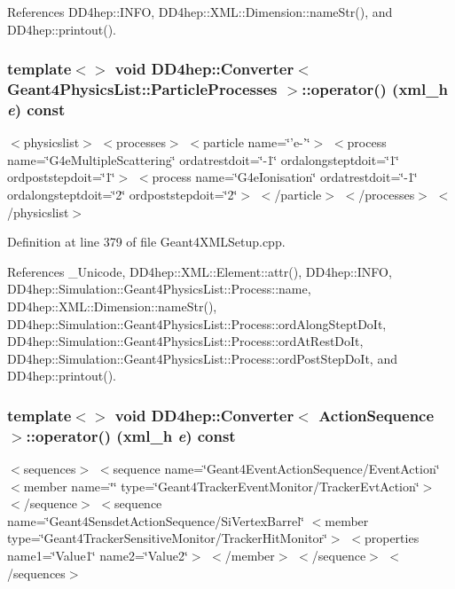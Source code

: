 References DD4hep::INFO, DD4hep::XML::Dimension::nameStr(), and DD4hep::printout().\hypertarget{struct_d_d4hep_1_1_converter_a981c80325c3558372d758b0661eb1582}{
\subsubsection[{operator()}]{\setlength{\rightskip}{0pt plus 5cm}template$<$$>$ void {\bf DD4hep::Converter}$<$ {\bf Geant4PhysicsList::ParticleProcesses} $>$::operator() ({\bf xml\_\-h} {\em e}) const}}
\label{struct_d_d4hep_1_1_converter_a981c80325c3558372d758b0661eb1582}
$<$physicslist$>$ $<$processes$>$ $<$particle name=\char`\"{}'e-\/'\char`\"{}$>$ $<$process name=\char`\"{}G4eMultipleScattering\char`\"{} ordatrestdoit=\char`\"{}-\/1\char`\"{} ordalongsteptdoit=\char`\"{}1\char`\"{} ordpoststepdoit=\char`\"{}1\char`\"{}$>$ $<$process name=\char`\"{}G4eIonisation\char`\"{} ordatrestdoit=\char`\"{}-\/1\char`\"{} ordalongsteptdoit=\char`\"{}2\char`\"{} ordpoststepdoit=\char`\"{}2\char`\"{}$>$ $<$/particle$>$ $<$/processes$>$ $<$/physicslist$>$ 

Definition at line 379 of file Geant4XMLSetup.cpp.

References \_\-Unicode, DD4hep::XML::Element::attr(), DD4hep::INFO, DD4hep::Simulation::Geant4PhysicsList::Process::name, DD4hep::XML::Dimension::nameStr(), DD4hep::Simulation::Geant4PhysicsList::Process::ordAlongSteptDoIt, DD4hep::Simulation::Geant4PhysicsList::Process::ordAtRestDoIt, DD4hep::Simulation::Geant4PhysicsList::Process::ordPostStepDoIt, and DD4hep::printout().\hypertarget{struct_d_d4hep_1_1_converter_aa8b8c091d8882f85bfe2ff60ea470090}{
\subsubsection[{operator()}]{\setlength{\rightskip}{0pt plus 5cm}template$<$$>$ void {\bf DD4hep::Converter}$<$ ActionSequence $>$::operator() ({\bf xml\_\-h} {\em e}) const}}
\label{struct_d_d4hep_1_1_converter_aa8b8c091d8882f85bfe2ff60ea470090}
$<$sequences$>$ $<$sequence name=\char`\"{}Geant4EventActionSequence/EventAction\char`\"{} $<$member name=\char`\"{}\char`\"{} type=\char`\"{}Geant4TrackerEventMonitor/TrackerEvtAction\char`\"{}$>$ $<$/sequence$>$ $<$sequence name=\char`\"{}Geant4SensdetActionSequence/SiVertexBarrel\char`\"{} $<$member type=\char`\"{}Geant4TrackerSensitiveMonitor/TrackerHitMonitor\char`\"{}$>$ $<$properties name1=\char`\"{}Value1\char`\"{} name2=\char`\"{}Value2\char`\"{}$>$ $<$/member$>$ $<$/sequence$>$ $<$/sequences$>$ 

